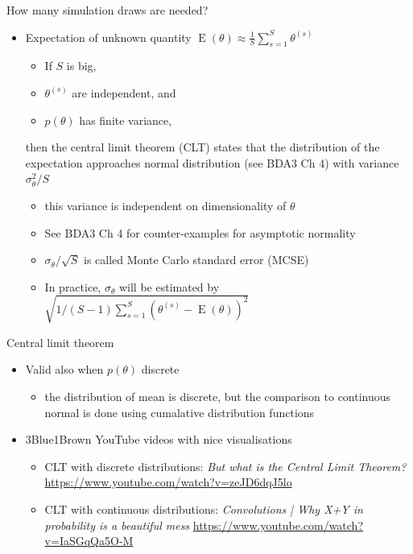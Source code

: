 \documentclass[english,t]{beamer}
\DeclareMathOperator{\E}{E}
\begin{document}
\begin{frame}{How many simulation draws are needed?}

  \begin{itemize}
  \item Expectation of unknown quantity $\E(\theta)\approx \frac{1}{S}\sum_{s=1}^S \theta^{(s)}$
    \begin{itemize}
    \item If $S$ is big,
    \item $\theta^{(s)}$ are independent, and 
    \item $p(\theta)$ has finite variance,
    \end{itemize}
    then the central limit theorem (CLT) states
    that the distribution of the expectation approaches normal
    distribution (see BDA3 Ch 4) with variance $\sigma^2_\theta/S$
    \begin{itemize}
    \item<1-> this variance is independent on dimensionality of $\theta$
    \item<2-> See BDA3 Ch 4 for counter-examples for asymptotic normality
      \pause
    \item<3-> $\sigma_\theta/\sqrt{S}$ is called Monte Carlo standard
      error (MCSE)
      \item<4-> In practice, $\sigma_{\theta}$ will be estimated by $ \sqrt{1/(S-1)\sum_{s = 1}^S (\theta^{(s)} - \E(\theta))^2}$
    \end{itemize}
\end{itemize}

\end{frame}

\begin{frame}{Central limit theorem}

  \begin{itemize}
  \item<+-> Valid also when $p(\theta)$ discrete
    \begin{itemize}
    \item the distribution of mean is discrete, but the comparison to
      continuous normal is done using cumalative distribution
      functions
    \end{itemize}
  \item<+-> 3Blue1Brown YouTube videos with nice visualisations
    \begin{itemize}
    \item CLT with discrete distributions: \textit{But what is the Central Limit Theorem?} \url{https://www.youtube.com/watch?v=zeJD6dqJ5lo}
    \item CLT with continuous distributions: \textit{Convolutions | Why X+Y in probability is a beautiful mess}  \url{https://www.youtube.com/watch?v=IaSGqQa5O-M}
    \end{itemize}
  \end{itemize}
\end{frame}
\end{document}
